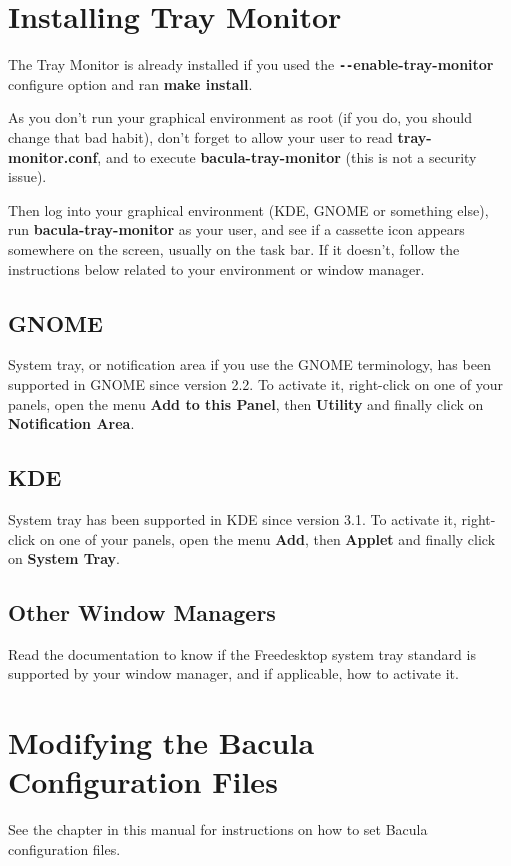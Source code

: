 \label{monitor}

\section{Installing Tray Monitor}

The Tray Monitor is already installed if you used the {\bf
\verb:--:enable-tray-monitor} configure option and ran {\bf make install}.

As you don't run your graphical environment as root (if you do, you should
change that bad habit), don't forget to allow your user to read {\bf
tray-monitor.conf}, and to execute {\bf bacula-tray-monitor} (this is not a
security issue).

Then log into your graphical environment (KDE, GNOME or something else), run
{\bf bacula-tray-monitor} as your user, and see if a cassette icon appears
somewhere on the screen, usually on the task bar.
If it doesn't, follow the instructions below related to your environment or
window manager. 

\subsection{GNOME}

System tray, or notification area if you use the GNOME terminology, has been
supported in GNOME since version 2.2. To activate it, right-click on one of
your panels, open the menu {\bf Add to this Panel}, then {\bf Utility} and
finally click on {\bf Notification Area}. 

\subsection{KDE}

System tray has been supported in KDE since version 3.1. To activate it,
right-click on one of your panels, open the menu {\bf Add}, then {\bf Applet}
and finally click on {\bf System Tray}. 

\subsection{Other Window Managers}

Read the documentation to know if the Freedesktop system tray standard is
supported by your window manager, and if applicable, how to activate it. 

\section{Modifying the Bacula Configuration Files}

See the chapter 
 in this manual for
instructions on how to set Bacula configuration files. 
